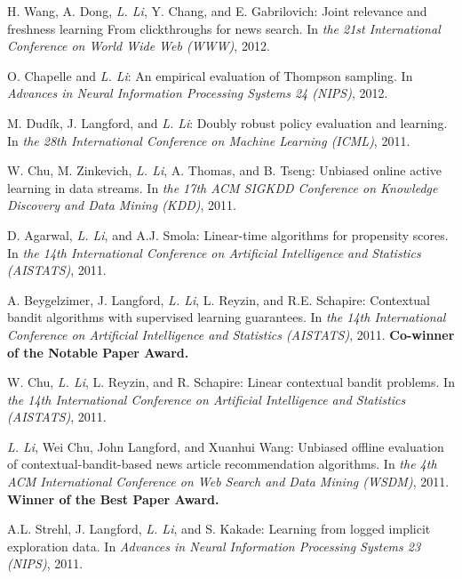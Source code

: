 \documentclass[10pt,twoside,letterpaper]{article}
\newcommand{\selffont}[1]{{\textit{#1}}}
\newcommand{\venuefont}[1]{{\textit{#1}}}
\newcommand{\myself}{\selffont{L. Li}}
\begin{document}
\begin{compactenum}[(C1)]
\item{H. Wang, A. Dong, \myself, Y. Chang, and E. Gabrilovich: Joint relevance and freshness learning From clickthroughs for news search.  In \venuefont{the 21st International Conference on World Wide Web (WWW)}, 2012.}

\item{O. Chapelle and \myself: An empirical evaluation of Thompson sampling.  In \venuefont{Advances in Neural Information Processing Systems 24 (NIPS)}, 2012.}

\item{M. Dud\'ik, J. Langford, and \myself: Doubly robust policy evaluation and learning.  In \venuefont{the 28th International Conference on Machine
Learning (ICML)}, 2011.}

\item{W. Chu, M. Zinkevich, \myself, A. Thomas, and B. Tseng: Unbiased online active learning in data streams.  In \venuefont{the 17th ACM SIGKDD Conference on Knowledge Discovery and Data Mining (KDD)}, 2011.}

\item{D. Agarwal, \myself, and A.J. Smola: Linear-time algorithms for propensity scores.  In \venuefont{the 14th International Conference on Artificial Intelligence and Statistics (AISTATS)}, 2011.}

\item{A. Beygelzimer, J. Langford, \myself, L. Reyzin, and R.E. Schapire: Contextual bandit algorithms with supervised learning guarantees.  In \venuefont{the 14th International Conference on Artificial Intelligence and Statistics (AISTATS)}, 2011.  \textbf{Co-winner of the Notable Paper Award.}}

\item{W. Chu, \myself, L. Reyzin, and R. Schapire: Linear contextual bandit problems.  In \venuefont{the 14th International Conference on Artificial Intelligence and Statistics (AISTATS)}, 2011.}

\item{\myself, Wei Chu, John Langford, and Xuanhui Wang: Unbiased offline evaluation of contextual-bandit-based news article recommendation algorithms.  In \venuefont{the 4th ACM International Conference on Web Search and Data Mining (WSDM)}, 2011.  \textbf{Winner of the Best Paper Award.}}

\item{A.L. Strehl, J. Langford, \myself, and S. Kakade: Learning from logged implicit exploration data.  In \venuefont{Advances in Neural Information Processing Systems 23 (NIPS)}, 2011.}


\end{compactenum}
\end{document}

